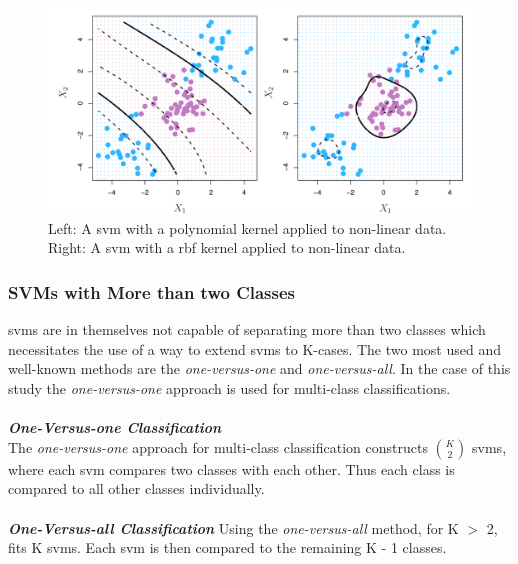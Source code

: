 \documentclass[11pt]{article}
\begin{document}
\begin{figure}[ht]
  \centering
  \includegraphics[width=12cm]{graphics/9_9.pdf}
  \caption{Left: A \gls{svm} with a polynomial kernel applied to non-linear data. Right: A \gls{svm} with a \gls{rbf} kernel applied to non-linear data.\cite{jamesSupportVectorMachines}}
\end{figure}

\subsubsection{SVMs with More than two Classes}
\glspl{svm} are in themselves not capable of separating more than two classes which necessitates the use of a way to extend \glspl{svm} to K-cases. The two most used and well-known methods are the \textit{one-versus-one} and \textit{one-versus-all}. In the case of this study the \textit{one-versus-one} approach is used for multi-class classifications\cite{jamesSupportVectorMachines}.\\
\\
\textbf{\textit{One-Versus-one Classification}}\\
The \textit{one-versus-one} approach for multi-class classification constructs $\binom{K}{2}$ \glspl{svm}, where each \gls{svm} compares two classes with each other. Thus each class is compared to all other classes individually.\cite{jamesSupportVectorMachines}\\
\\
\textbf{\textit{One-Versus-all Classification}}
Using the \textit{one-versus-all} method, for K $>$ 2, fits K \glspl{svm}. Each \gls{svm} is then compared to the remaining K - 1 classes.\cite{jamesSupportVectorMachines}
\end{document}
